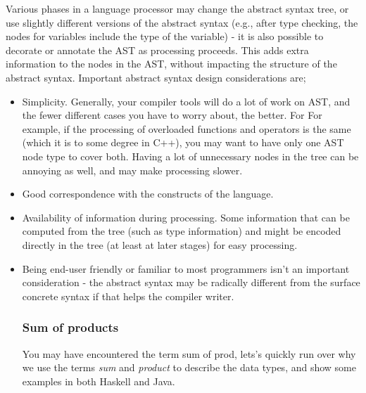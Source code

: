 \documentclass{article}
\begin{document}
        Various phases in a language processor may change the abstract syntax
        tree, or use slightly different versions of the abstract syntax (e.g., after type
        checking, the nodes for variables include the type of the variable) - it is also
        possible to decorate or annotate the AST as processing proceeds. 
        This adds extra information to the nodes in the AST, without impacting the structure of the abstract syntax.
        Important abstract syntax design considerations are;
        \begin{itemize}
            \item Simplicity. Generally, your compiler tools will do a lot of work on AST,
            and the fewer different cases you have to worry about, the better. For
            For example, if the processing of overloaded functions and operators is the same (which it is to some degree in C++), you may want to have
            only one AST node type to cover both. Having a lot of unnecessary nodes
            in the tree can be annoying as well, and may make processing slower.
            \item Good correspondence with the constructs of the language.
            \item Availability of information during processing. Some information that
            can be computed from the tree (such as type information) and might be encoded directly in the tree (at least at later stages) for easy processing.
            \item Being end-user friendly or familiar to most programmers isn't an important consideration - the abstract syntax may be radically different from
            the surface concrete syntax if that helps the compiler writer.
            \subsubsection{Sum of products}
            You may have encountered the term \gls{sum of prod}, lets's quickly run over why we use the terms \textit{sum} and \textit{product} 
            to describe the data types, and show some examples in both Haskell and Java.

\end{itemize}
\end{document}
